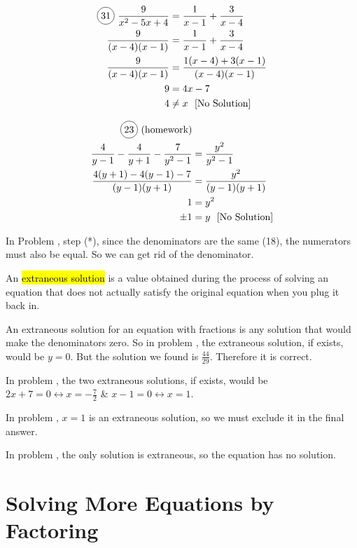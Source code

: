 \begin{multicols}{2}
\begin{align*}
  \circled{31}\ \frac{9}{x^{2}-5x+4}&=\frac{1}{x-1}+\frac{3}{x-4}\\
  \frac{9}{(x-4)(x-1)}&=\frac{1}{x-1}+\frac{3}{x-4}\\
  \frac{9}{(x-4)(x-1)}&=\frac{1(x-4)+3(x-1)}{(x-4)(x-1)}\\
  9&=4x-7\\
  4&\neq x\ \text{ [No Solution]}
\end{align*}

\begin{align*}
  \circled{23}\ \text{(homework)}&\\
  \frac{4}{y-1}-\frac{4}{y+1}-\frac{7}{y^{2}-1}&=\frac{y^{2}}{y^{2}-1}\\
  \frac{4(y+1)-4(y-1)-7}{(y-1)(y+1)}&=\frac{y^{2}}{(y-1)(y+1)}\\
  1&=y^{2}\\
  \pm 1&=y\ \text{ [No Solution]}\\
\end{align*}
\end{multicols}

In Problem , step (*), since the denominators are the same (18), the numerators must also be equal. So we can get rid of the denominator.

\vspace{.4cm}

An \hl{extraneous solution} is a value obtained during the process of solving an equation that does not actually satisfy the original equation when you plug it back in.

An extraneous solution for an equation with fractions is any solution that would make the denominators zero. So in problem , the extraneous solution, if exists, would be $y=0$. But the solution we found is $\frac{44}{29}$. Therefore it is correct.

In problem , the two extraneous solutions, if exists, would be $2x+7=0\leftrightarrow x=-\frac{7}{2}$ \& $x-1=0 \leftrightarrow x=1$.

In problem , $x=1$ is an extraneous solution, so we must exclude it in the final answer.

In problem , the only solution is extraneous, so the equation has no solution.

\section{Solving More Equations by Factoring}


